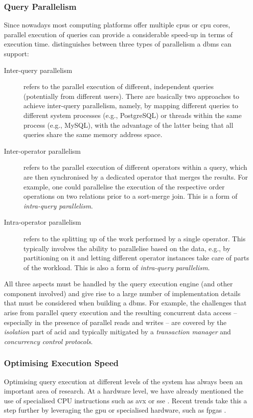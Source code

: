 \subsubsection{Query Parallelism}

Since nowadays most computing platforms offer multiple \acrshort{cpu}s or \acrshort{cpu} cores, parallel execution of queries can provide a considerable speed-up in terms of execution time. \cite{Graefe:1993Query} distinguishes between three types of parallelism a \acrshort{dbms} can support:

\begin{description}
    \item[Inter-query parallelism] refers to the parallel execution of different, independent queries (potentially from different users). There are basically two approaches to achieve inter-query parallelism, namely, by mapping different queries to different system processes (e.g., PostgreSQL) or threads within the same process (e.g., MySQL), with the advantage of the latter being that all queries share the same memory address space.
    \item[Inter-operator parallelism] refers to the parallel execution of different operators within a query, which are then synchronised by a dedicated operator that merges the results. For example, one could parallelise the execution of the respective order operations on two relations prior to a sort-merge join. This is a form of \emph{intra-query parallelism}.
    \item[Intra-operator parallelism] refers to the splitting up of the work performed by a single operator. This typically involves the ability to parallelise based on the data, e.g., by partitioning on it and letting different operator instances take care of parts of the workload. This is also a form of \emph{intra-query parallelism}.
\end{description}

All three aspects must be handled by the query execution engine (and other component involved) and give rise to a large number of implementation details that must be considered when building a \acrshort{dbms}. For example, the challenges that arise from parallel query execution and the resulting concurrent data access -- especially in the presence of parallel reads and writes -- are covered by the \emph{isolation} part of \acrshort{acid} and typically mitigated by a \emph{transaction manager} and \emph{concurrency control protocols}.

\subsubsection{Optimising Execution Speed}
Optimising query execution at different levels of the system has always been an important area of research. At a hardware level, we have already mentioned the use of specialised CPU instructions such as \acrshort{avx} or \acrshort{sse} \cite{Idreos:2012MonetDB,Polychroniou:2020VIP,Polychroniou:2019Towards,Shen:2021Using}. Recent trends take this a step further by leveraging the \acrshort{gpu} or specialised hardware, such as \acrshort{fpga}s \cite{Abadi:2014Beckman,Abadi:2020Seattle,Paul:2021Database}.

